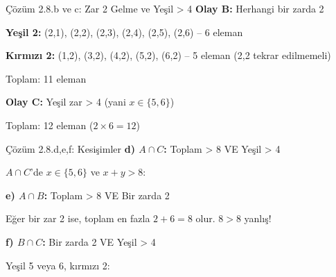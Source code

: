 \documentclass[light]{lutbeamer}
\begin{document}
\begin{frame}{Çözüm 2.8.b ve c: Zar 2 Gelme ve Yeşil > 4}
    \color{blue}
    \textbf{Olay B:} Herhangi bir zarda 2
    
    \textbf{Yeşil 2:} (2,1), (2,2), (2,3), (2,4), (2,5), (2,6) -- 6 eleman
    
    \textbf{Kırmızı 2:} (1,2), (3,2), (4,2), (5,2), (6,2) -- 5 eleman (2,2 tekrar edilmemeli)
    
    \begin{center}
    \end{center}
    
    Toplam: 11 eleman
    
    \vspace{0.5cm}
    \textbf{Olay C:} Yeşil zar > 4 (yani $x \in \{5,6\}$)
    
    \begin{center}
    \end{center}
    
    Toplam: 12 eleman ($2 \times 6 = 12$)
\end{frame}

\begin{frame}{Çözüm 2.8.d,e,f: Kesişimler}
    \color{blue}
    \textbf{d) $A \cap C$:} Toplam > 8 VE Yeşil > 4
    
    $A \cap C$'de $x \in \{5,6\}$ ve $x + y > 8$:
    \begin{center}
    \end{center}
    
    \vspace{0.3cm}
    \textbf{e) $A \cap B$:} Toplam > 8 VE Bir zarda 2
    
    Eğer bir zar 2 ise, toplam en fazla $2 + 6 = 8$ olur. $8 > 8$ yanlış!
    \begin{center}
    \end{center}
    
    \vspace{0.3cm}
    \textbf{f) $B \cap C$:} Bir zarda 2 VE Yeşil > 4
    
    Yeşil 5 veya 6, kırmızı 2:
    \begin{center}
    \end{center}
\end{frame}
\end{document}
